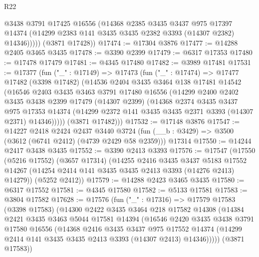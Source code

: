 \begin{lexlean}{R22}
\begin{coremodule}
            @3438
            @3791
            @17425
            @16556
            (@14368
              @2385
              @3435
              @3437
              @975
              @17397
              @14374
              (@14299 @2383 @141 @3435 @3435 @2382 @3393 (@14307 @2382) @14346)))))
      (@3871 @17428))
@17474 := @17304 @3876
@17477 := @14288 @2405 @3465 @3435
@17478 := @3390 @2399
@17479 := @6317 @17353
@17480 := @17478 @17479
@17481 := @4345 @17480
@17482 := @3989 @17481
@17531 := @17377
    (fun ("_" : @17149) =>
    @17473
      (fun ("_" : @17474) =>
      @17477
        @17482
        (@3398 @17482)
        (@14536
          @2404
          @3435
          @3464
          @138
          @17481
          @14542
          (@16546
            @2403
            @3435
            @3463
            @3791
            @17480
            @16556
            (@14299
              @2400
              @2402
              @3435
              @3438
              @2399
              @17479
              (@14307 @2399)
              (@14368
                @2374
                @3435
                @3437
                @975
                @17353
                @14374
                (@14299 @2372 @141 @3435 @3435 @2371 @3393 (@14307 @2371) @14346)))))
        (@3871 @17482)))
@17532 := @17148 @3876
@17547 := @14227
    @2418
    @2424
    @2437
    @3440
    @3724
    (fun (__b : @3429) => @3500 (@3612 (@6741 @2412) (@4739 @2429 @58 @2359)))
    @17314
@17550 := @14244 @2417 @3438 @3435
@17552 := @3390 @2413 @3393
@17576 := @17547
    (@17550
      (@5216 @17552)
      (@3657 @17314)
      (@14255
        @2416
        @3435
        @3437
        @5183
        @17552
        @14267
        (@14254 @2414 @141 @3435 @3435 @2413 @3393 (@14276 @2413) @14279))
      (@5252 @2412))
@17579 := @14288 @2423 @3465 @3435
@17580 := @6317 @17552
@17581 := @4345 @17580
@17582 := @5133 @17581
@17583 := @3804 @17582
@17628 := @17576
    (fun ("_" : @17316) =>
    @17579
      @17583
      (@3398 @17583)
      (@14300
        @2422
        @3435
        @3464
        @218
        @17582
        @14308
        (@14384
          @2421
          @3435
          @3463
          @5044
          @17581
          @14394
          (@16546
            @2420
            @3435
            @3438
            @3791
            @17580
            @16556
            (@14368
              @2416
              @3435
              @3437
              @975
              @17552
              @14374
              (@14299 @2414 @141 @3435 @3435 @2413 @3393 (@14307 @2413) @14346)))))
      (@3871 @17583))

\end{coremodule}
\end{lexlean}
